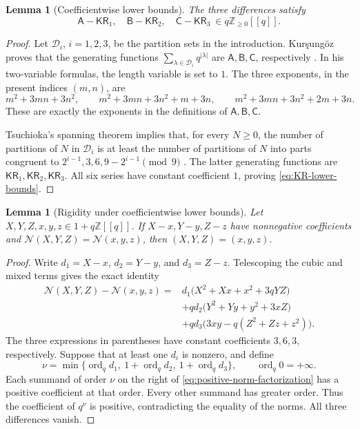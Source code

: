 \documentclass[11pt]{article}
\numberwithin{equation}{section}
\newtheorem{lemma}[theorem]{Lemma}
\theoremstyle{remark}
\newcommand{\KR}{\mathsf{KR}}
\newcommand{\ord}{\operatorname{ord}}
\begin{document}
\begin{lemma}[Coefficientwise lower bounds]\label{lem:KR-lower-bounds}
The three differences satisfy
\begin{equation}\label{eq:KR-lower-bounds}
 \mathsf A-\KR_1,\quad \mathsf B-\KR_2,\quad
 \mathsf C-\KR_3\ \in q\mathbb Z_{\geq0}[[q]].
\end{equation}
\end{lemma}

\begin{proof}
Let \(\mathcal D_i\), \(i=1,2,3\), be the partition sets in the introduction.
Kur\c{s}ung\"oz proves that the generating functions
\(\sum_{\lambda\in\mathcal D_i}q^{|\lambda|}\) are
\(\mathsf A,\mathsf B,\mathsf C\), respectively
\cite[Theorems 7--9, equations (1), (38), (85)]{Kursungoz2019}.
In his two-variable formulas, the length variable is set to \(1\).
The three exponents, in the present indices \((m,n)\), are
\[
 m^2+3mn+3n^2,\qquad
 m^2+3mn+3n^2+m+3n,\qquad
 m^2+3mn+3n^2+2m+3n.
\]
These are exactly the exponents in the definitions of \(\mathsf A,\mathsf B,\mathsf C\).

Tsuchioka's spanning theorem implies that, for every \(N\geq0\),
the number of partitions of \(N\) in \(\mathcal D_i\) is at least
the number of partitions of \(N\) into parts congruent to
\(2^{i-1},3,6,9-2^{i-1}\pmod9\)
\cite[Corollary 1.4]{Tsuchioka2022}.
The latter generating functions are \(\KR_1,\KR_2,\KR_3\).
All six series have constant coefficient \(1\), proving
\eqref{eq:KR-lower-bounds}.
\end{proof}

\begin{lemma}[Rigidity under coefficientwise lower bounds]
\label{lem:positive-norm-rigidity}
Let \(X,Y,Z,x,y,z\in1+q\mathbb Z[[q]]\).  If
\(X-x,Y-y,Z-z\) have nonnegative coefficients and
\(\mathcal N(X,Y,Z)=\mathcal N(x,y,z)\), then
\((X,Y,Z)=(x,y,z)\).
\end{lemma}

\begin{proof}
Write \(d_1=X-x\), \(d_2=Y-y\), and \(d_3=Z-z\).
Telescoping the cubic and mixed terms gives the exact identity
\begin{equation}\label{eq:positive-norm-factorization}
\begin{aligned}
 \mathcal N(X,Y,Z)-\mathcal N(x,y,z)
 ={}&d_1\bigl(X^2+Xx+x^2+3qYZ\bigr)\\
 &+qd_2\bigl(Y^2+Yy+y^2+3xZ\bigr)\\
 &+qd_3\bigl(3xy-q(Z^2+Zz+z^2)\bigr).
\end{aligned}
\end{equation}
The three expressions in parentheses have constant coefficients
\(3,6,3\), respectively.  Suppose that at least one \(d_i\) is
nonzero, and define
\[
 \nu=\min\{\ord_qd_1,\ 1+\ord_qd_2,\ 1+\ord_qd_3\},
 \qquad \ord_q0=+\infty.
\]
Each summand of order \(\nu\) on the right of
\eqref{eq:positive-norm-factorization} has a positive coefficient
at that order.  Every other summand has greater order.  Thus the
coefficient of \(q^\nu\) is positive, contradicting the equality of
the norms.  All three differences vanish.
\end{proof}
\end{document}
